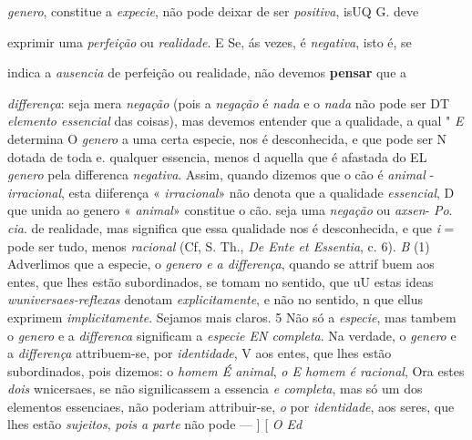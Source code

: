 \emph{genero}, constitue a \emph{expecie}, não pode deixar de ser \emph{positiva}, isUQ G. deve

exprimir uma \emph{perfeição} ou \emph{realidade}. E Se, ás vezes, é \emph{negativa}, isto é, se

indica a \emph{ausencia} de perfeição ou realidade, não devemos \textbf{pensar} que a

\emph{differença}: seja mera \emph{negação} (pois a \emph{negação} é \emph{nada} e o \emph{nada} não pode ser DT \emph{elemento essencial} das coisas), mas devemos entender que a qualidade, a qual " \emph{E} determina O \emph{genero} a uma certa especie, nos é desconhecida, e que pode ser N dotada de toda e. qualquer essencia, menos d aquella que é afastada do EL \emph{genero} pela differenca \emph{negativa}. Assim, quando dizemos que o cão é \emph{animal} - \emph{irracional}, esta diiferença « \emph{irracional}» não denota que a qualidade \emph{essencial}, D que unida ao genero « \emph{animal}» constitue o cão. seja uma \emph{negação} ou \emph{axsen}- \emph{Po}. \emph{cia}. de realidade, mas significa que essa qualidade nos é desconhecida, e que \emph{i} = pode ser tudo, menos \emph{racional} (Cf, S. Th., \emph{De Ente et Essentia}, c. 6). \emph{B} (1) Adverlimos que a especie, o \emph{genero e a differença}, quando se attrif buem aos entes, que lhes estão subordinados, se tomam no sentido, que uU estas ideas \emph{wuniversaes-reflexas} denotam \emph{explicitamente}, e não no sentido, \textbar{} n que ellus exprimem \emph{implicitamente}. Sejamos mais claros. 5 Não só a \emph{especie}, mas tambem o \emph{genero} e a \emph{differenca} significam a \emph{especie EN completa}. Na verdade, o \emph{genero} e a \emph{differença} attribuem-se, por \emph{identidade}, V aos entes, que lhes estão subordinados, pois dizemos: o \emph{homem É animal}, \emph{o E homem é racional}, Ora estes \emph{dois} wnicersaes, se não signilicassem a essencia \emph{e completa}, mas só um dos elementos essenciaes, não poderiam attribuir-se, \emph{o} por \emph{identidade}, aos seres, que lhes estão \emph{sujeitos}, \emph{pois a parte} não pode --- ] [ \emph{O Ed}


